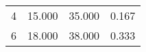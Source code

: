 % 
\begin{tabular}{cccc}
  \hline
  \hline
4 & 15.000 & 35.000 & 0.167 \\ 
  6 & 18.000 & 38.000 & 0.333 \\ 
   \hline
\end{tabular}

